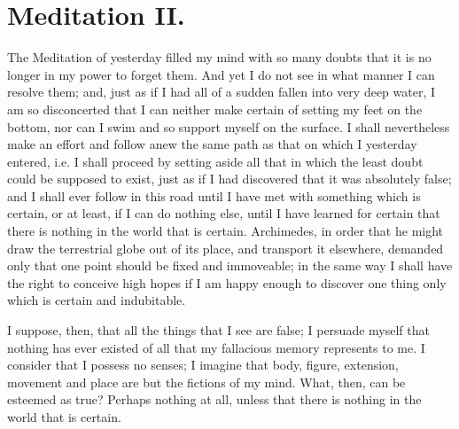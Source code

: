 \section{Meditation II.}

\begin{abstract}{c} Of the Nature of the Human Mind; and that it is
more easily known than the Body. \end{abstract}

\noindent The Meditation of yesterday filled my mind with so many
doubts that it is no longer in my power to forget them. And yet I do
not see in what manner I can resolve them; and, just as if I had all
of a sudden fallen into very deep water, I am so disconcerted that I
can neither make certain of setting my feet on the bottom, nor can I
swim and so support myself on the surface. I shall nevertheless make
an effort and follow anew the same path as that on which I yesterday
entered, i.e. I shall proceed by setting aside all that in which the
least doubt could be supposed to exist, just as if I had discovered
that it was absolutely false; and I shall ever follow in this road
until I have met with something which is certain, or at least, if I
can do nothing else, until I have learned for certain that there is
nothing in the world that is certain. Archimedes, in order that he
might draw the terrestrial globe out of its place, and transport it
elsewhere, demanded only that one point should be fixed and
immoveable; in the same way I shall have the right to conceive high
hopes if I am happy enough to discover one thing only which is certain
and indubitable.

I suppose, then, that all the things that I see are false; I persuade
myself that nothing has ever existed of all that my fallacious memory
represents to me. I consider that I possess no senses; I imagine that
body, figure, extension, movement and place are but the fictions of my
mind. What, then, can be esteemed as true? Perhaps nothing at all,
unless that there is nothing in the world that is certain.

